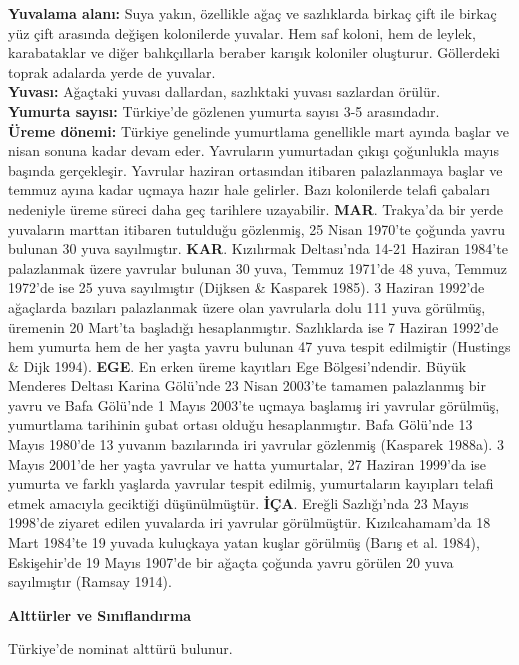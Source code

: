 \documentclass[
  letterpaper,
  DIV=11,
  numbers=noendperiod]{scrreprt}
\begin{document}
\textbf{Yuvalama alanı:} Suya yakın, özellikle ağaç ve sazlıklarda
birkaç çift ile birkaç yüz çift arasında değişen kolonilerde yuvalar.
Hem saf koloni, hem de leylek, karabataklar ve diğer balıkçıllarla
beraber karışık koloniler oluşturur. Göllerdeki toprak adalarda yerde de
yuvalar.\\
\textbf{Yuvası:} Ağaçtaki yuvası dallardan, sazlıktaki yuvası sazlardan
örülür.\\
\textbf{Yumurta sayısı:} Türkiye'de gözlenen yumurta sayısı 3-5
arasındadır.\\
\textbf{Üreme dönemi:} Türkiye genelinde yumurtlama genellikle mart
ayında başlar ve nisan sonuna kadar devam eder. Yavruların yumurtadan
çıkışı çoğunlukla mayıs başında gerçekleşir. Yavrular haziran ortasından
itibaren palazlanmaya başlar ve temmuz ayına kadar uçmaya hazır hale
gelirler. Bazı kolonilerde telafi çabaları nedeniyle üreme süreci daha
geç tarihlere uzayabilir. \textbf{MAR}. Trakya'da bir yerde yuvaların
marttan itibaren tutulduğu gözlenmiş, 25 Nisan 1970'te çoğunda yavru
bulunan 30 yuva sayılmıştır. \textbf{KAR}. Kızılırmak Deltası'nda 14-21
Haziran 1984'te palazlanmak üzere yavrular bulunan 30 yuva, Temmuz
1971'de 48 yuva, Temmuz 1972'de ise 25 yuva sayılmıştır (Dijksen \&
Kasparek 1985). 3 Haziran 1992'de ağaçlarda bazıları palazlanmak üzere
olan yavrularla dolu 111 yuva görülmüş, üremenin 20 Mart'ta başladığı
hesaplanmıştır. Sazlıklarda ise 7 Haziran 1992'de hem yumurta hem de her
yaşta yavru bulunan 47 yuva tespit edilmiştir (Hustings \& Dijk 1994).
\textbf{EGE}. En erken üreme kayıtları Ege Bölgesi'ndendir. Büyük
Menderes Deltası Karina Gölü'nde 23 Nisan 2003'te tamamen palazlanmış
bir yavru ve Bafa Gölü'nde 1 Mayıs 2003'te uçmaya başlamış iri yavrular
görülmüş, yumurtlama tarihinin şubat ortası olduğu hesaplanmıştır. Bafa
Gölü'nde 13 Mayıs 1980'de 13 yuvanın bazılarında iri yavrular gözlenmiş
(Kasparek 1988a). 3 Mayıs 2001'de her yaşta yavrular ve hatta
yumurtalar, 27 Haziran 1999'da ise yumurta ve farklı yaşlarda yavrular
tespit edilmiş, yumurtaların kayıpları telafi etmek amacıyla geciktiği
düşünülmüştür. \textbf{İÇA}. Ereğli Sazlığı'nda 23 Mayıs 1998'de ziyaret
edilen yuvalarda iri yavrular görülmüştür. Kızılcahamam'da 18 Mart
1984'te 19 yuvada kuluçkaya yatan kuşlar görülmüş (Barış et al. 1984),
Eskişehir'de 19 Mayıs 1907'de bir ağaçta çoğunda yavru görülen 20 yuva
sayılmıştır (Ramsay 1914).

\textbf{Alttürler ve Sınıflandırma}

Türkiye'de nominat alttürü bulunur.
\end{document}

